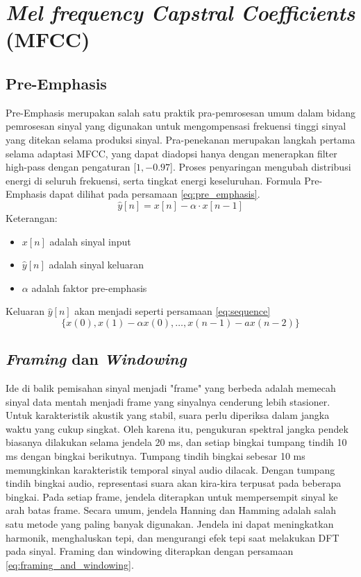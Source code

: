 \chapter{\textit{Mel frequency Capstral Coefficients} (MFCC)}
    \section{Pre-Emphasis}
    Pre-Emphasis merupakan salah satu praktik pra-pemrosesan umum dalam bidang pemrosesan sinyal yang digunakan untuk mengompensasi frekuensi tinggi sinyal yang ditekan selama produksi sinyal. Pra-penekanan merupakan langkah pertama selama adaptasi MFCC, yang dapat diadopsi hanya dengan menerapkan filter high-pass dengan pengaturan [$1, -0.97$]. Proses penyaringan mengubah distribusi energi di seluruh frekuensi, serta tingkat energi keseluruhan. Formula Pre-Emphasis dapat dilihat pada persamaan \ref{eq:pre_emphasis}.
    \begin{equation}
        \hat{y}[n] = x[n] - \alpha \cdot x[n-1]
        \label{eq:pre_emphasis}
    \end{equation}
    Keterangan:
\begin{itemize}
    \item $x[n]$ adalah sinyal input
    \item $\hat{y}[n]$ adalah sinyal keluaran
    \item $\alpha$ adalah faktor pre-emphasis
\end{itemize}
    Keluaran $\hat{y}[n]$ akan menjadi seperti persamaan \ref{eq:sequence}
    \begin{equation}
        \{x(0), x(1) - \alpha x(0), \ldots, x(n-1) - ax(n-2)\}
    \label{eq:sequence}
    \end{equation}

    \section{\textit{Framing} dan \textit{Windowing}}
    Ide di balik pemisahan sinyal menjadi "frame" yang berbeda adalah memecah sinyal data mentah menjadi frame yang sinyalnya cenderung lebih stasioner. Untuk karakteristik akustik yang stabil, suara perlu diperiksa dalam jangka waktu yang cukup singkat. Oleh karena itu, pengukuran spektral jangka pendek biasanya dilakukan selama jendela 20 ms, dan setiap bingkai tumpang tindih 10 ms dengan bingkai berikutnya. Tumpang tindih bingkai sebesar 10 ms memungkinkan karakteristik temporal sinyal audio dilacak. Dengan tumpang tindih bingkai audio, representasi suara akan kira-kira terpusat pada beberapa bingkai.
    Pada setiap frame, jendela diterapkan untuk mempersempit sinyal ke arah batas frame. Secara umum, jendela Hanning dan Hamming \cite{rao2017speech} adalah salah satu metode yang paling banyak digunakan. Jendela ini dapat meningkatkan harmonik, menghaluskan tepi, dan mengurangi efek tepi saat melakukan DFT pada sinyal. Framing dan windowing diterapkan dengan persamaan \ref{eq:framing_and_windowing}.

